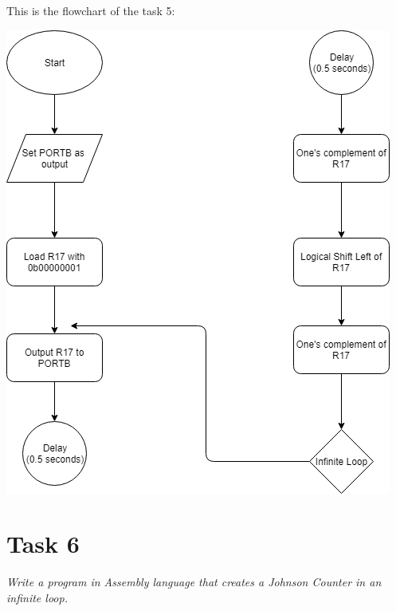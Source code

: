\documentclass[a4paper,12pt]{article}
\begin{document}
This is the flowchart of the task 5:
\begin{center}
\includegraphics[scale=0.7]{img/Task5.png}
\end{center}
\newpage
\section{Task 6}
\textit{Write a program in Assembly language that creates a Johnson Counter in an infinite loop.}
\end{document}
